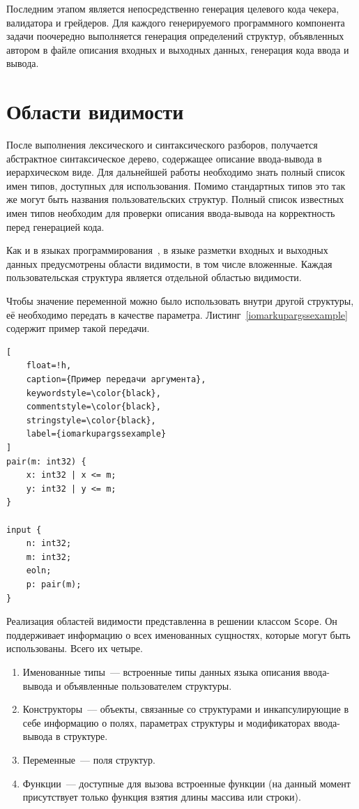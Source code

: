 \documentclass[times,specification,annotation]{style/itmo-student-thesis/itmo-student-thesis}
\begin{document}
Последним этапом является непосредственно генерация целевого кода чекера, валидатора и грейдеров. Для каждого генерируемого программного компонента задачи поочередно выполняется генерация определений структур, объявленных автором в файле описания входных и выходных данных, генерация кода ввода и вывода.

\section{Области видимости}

После выполнения лексического и синтаксического разборов, получается абстрактное синтаксическое дерево, содержащее описание ввода-вывода в иерархическом виде. Для дальнейшей работы необходимо знать полный список имен типов, доступных для использования. Помимо стандартных типов это так же могут быть названия пользовательских структур. Полный список известных имен типов необходим для проверки описания ввода-вывода на корректность перед генерацией кода.

Как и в языках программирования~\cite{aho-compilers}, в языке разметки входных и выходных данных предусмотрены области видимости, в том числе вложенные. Каждая пользовательская структура является отдельной областью видимости.

Чтобы значение переменной можно было использовать внутри другой структуры, её необходимо передать в качестве параметра. Листинг~\ref{iomarkupargssexample} содержит пример такой передачи.

\begin{lstlisting}[
    float=!h,
    caption={Пример передачи аргумента},
    keywordstyle=\color{black},
    commentstyle=\color{black},
    stringstyle=\color{black},
    label={iomarkupargssexample}
]
pair(m: int32) {
    x: int32 | x <= m;
    y: int32 | y <= m;
}

input {
    n: int32;
    m: int32;
    eoln;
    p: pair(m);
}

\end{lstlisting}

Реализация областей видимости представленна в решении классом \texttt{Scope}. Он поддерживает информацию о всех именованных сущностях, которые могут быть использованы. Всего их четыре.

\begin{enumerate}[leftmargin=1.75cm]
    \item Именованные типы~--- встроенные типы данных языка описания ввода-вывода и объявленные пользователем структуры.
    \item Конструкторы~--- объекты, связанные со структурами и инкапсулирующие в себе информацию о полях, параметрах структуры и модификаторах ввода-вывода в структуре.
    \item Переменные~--- поля структур.
    \item Функции~--- доступные для вызова встроенные функции (на данный момент присутствует только функция взятия длины массива или строки).
\end{enumerate}
\end{document}
